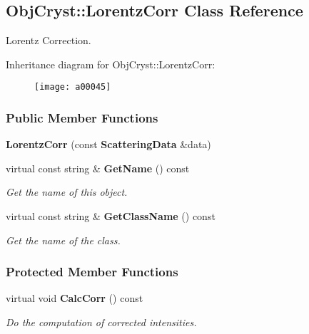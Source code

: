 \subsection{Obj\-Cryst\-:\-:Lorentz\-Corr Class Reference}
\label{a00045}


Lorentz Correction.  


Inheritance diagram for Obj\-Cryst\-:\-:Lorentz\-Corr\-:\begin{figure}[H]
\begin{center}
\leavevmode
\texttt{[image: a00045]}
\end{center}
\end{figure}
\subsubsection*{Public Member Functions}
\begin{DoxyCompactItemize}
\item 
{\bfseries Lorentz\-Corr} (const {\bf Scattering\-Data} \&data)\label{a00045_a9f814b060cfafe4e829dc3977d9a7f1b}

\item 
virtual const string \& {\bf Get\-Name} () const \label{a00045_ab57782d9fe860701bb87309742afe2e5}

\begin{DoxyCompactList}\small\item\em Get the name of this object. \end{DoxyCompactList}\item 
virtual const string \& {\bf Get\-Class\-Name} () const \label{a00045_a740bd7f01b62a994ad5bc1c121d1e626}

\begin{DoxyCompactList}\small\item\em Get the name of the class. \end{DoxyCompactList}\end{DoxyCompactItemize}
\subsubsection*{Protected Member Functions}
\begin{DoxyCompactItemize}
\item 
virtual void {\bf Calc\-Corr} () const \label{a00045_adc247e6477f11474c542f2979984d238}

\begin{DoxyCompactList}\small\item\em Do the computation of corrected intensities. \end{DoxyCompactList}\end{DoxyCompactItemize}
